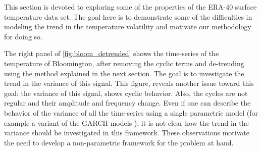 \documentclass{article}
\begin{document}
This section is devoted to exploring some of the properties of the
ERA-40 surface temperature data set. The goal here is to demonstrate
some of the difficulties in modeling the trend in the temperature
volatility and motivate our methodology for doing so. 



The right panel of \autoref{fig:bloom_detrended} shows the time-series
of the temperature of Bloomington, after removing the cyclic terms and
de-trending using the method explained in the next section. The goal
is to investigate the trend in the variance of this signal. This
figure, reveals another issue toward this goal: the variance of this
signal, shows cyclic behavior. Also, the cycles are not regular and
their amplitude and frequency change. Even if one can describe the
behavior of the variance of all the time-series using a single
parametric model (for example a variant of the GARCH models
\citep{bollerslev_generalized_1986}), it is not clear how the trend in
the variance should be investigated in this framework. These
observations motivate the need to develop a non-parametric framework
for the problem at hand. 
\end{document}
